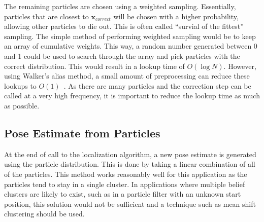 			The remaining particles are chosen using a weighted sampling. Essentially, particles that are closest to $\textbf{x}_{correct}$ will be chosen with a higher probability, allowing other particles to die out. This is often called ``survial of the fittest'' sampling. The simple method of performing weighted sampling would be to keep an array of cumulative weights. This way, a random number generated between 0 and 1 could be used to search through the array and pick particles with the correct distribution. This would result in a lookup time of $O(\log{N})$. However, using Walker's alias method, a small amount of preprocessing can reduce these lookups to $O(1)$~\cite{Walker}. As there are many particles and the correction step can be called at a very high frequency, it is important to reduce the lookup time as much as possible.

	\subsection{Pose Estimate from Particles}
		At the end of call to the localization algorithm, a new pose estimate is generated using the particle distribution. This is done by taking a linear combination of all of the particles. This method works reasonably well for this application as the particles tend to stay in a single cluster. In applications where multiple belief clusters are likely to exist, such as in a particle filter with an unknown start position, this solution would not be sufficient and a technique such as mean shift clustering should be used. 


